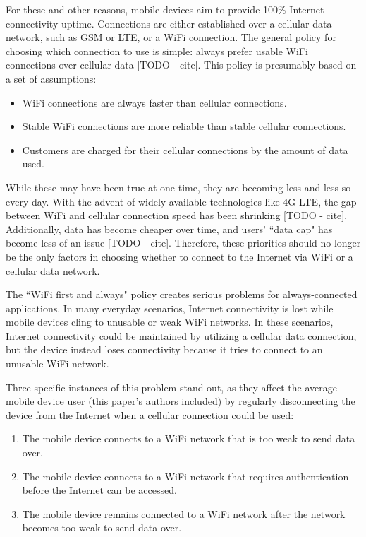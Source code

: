 For these and other reasons, mobile devices aim to provide 100\% Internet connectivity uptime. Connections are either established over a cellular data network, such as GSM or LTE, or a WiFi connection. The general policy for choosing which connection to use is simple: always prefer usable WiFi connections over cellular data [TODO - cite]. This policy is presumably based on a set of assumptions:

\begin{itemize}
\item WiFi connections are always faster than cellular connections.
\item Stable WiFi connections are more reliable than stable cellular connections.
\item Customers are charged for their cellular connections by the amount of data used.
\end{itemize}

While these may have been true at one time, they are becoming less and less so every day. With the advent of widely-available technologies like 4G LTE, the gap between WiFi and cellular connection speed has been shrinking [TODO - cite]. Additionally, data has become cheaper over time, and users' ``data cap" has become less of an issue [TODO - cite]. Therefore, these priorities should no longer be the only factors in choosing whether to connect to the Internet via WiFi or a cellular data network.

The ``WiFi first and always" policy creates serious problems for always-connected applications. In many everyday scenarios, Internet connectivity is lost while mobile devices cling to unusable or weak WiFi networks. In these scenarios, Internet connectivity could be maintained by utilizing a cellular data connection, but the device instead loses connectivity because it tries to connect to an unusable WiFi network.

Three specific instances of this problem stand out, as they affect the average mobile device user (this paper's authors included) by regularly disconnecting the device from the Internet when a cellular connection could be used:

\begin{enumerate}
\item The mobile device connects to a WiFi network that is too weak to send data over.
\item The mobile device connects to a WiFi network that requires authentication before the Internet can be accessed.
\item The mobile device remains connected to a WiFi network after the network becomes too weak to send data over.
\end{enumerate}

